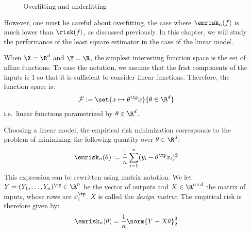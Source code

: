 \documentclass{../cs-classes/cs-classes}
\begin{document}
\begin{figure}
    \centering
    \captionsetup{justification=centering}
    \caption{Overfitting and underfitting}
\end{figure}
However, one must be careful about overfitting, the case where $\emrisk_n(f)$ is much lower than $\risk(f)$, as discussed previously. In this chapter, we will study the performance of the least square estimator in the case of the linear model.

\begin{definition}
    When $\X=\R^d$ and $\Y=\R$, the simplest interesting function space is the set of affine functions. To ease the notation, we assume that the frist components of the inputs is 1 so that it is sufficient to consider linear functions. Therefore, the function space is:
    \begin{equation}
        \mathcal{F}:=\set{x\mapsto \theta^\tp x}{\theta\in\R^d}
    \end{equation}
    i.e.~linear functions parametrized by $\theta\in\R^d$.
\end{definition}

\begin{remark}
    Choosing a linear model, the empirical risk minimization corresponds to the problem of minimizing the following quantity over $\theta\in\R^d$:
    \begin{equation*}
        \emrisk_n(\theta):=\frac{1}{n}\sum_{i=1}^n(y_i-\theta^\tp x_i)^2
    \end{equation*}
    This expression can be rewritten using matrix notation. We let $Y=(Y_1, \dots, Y_n)^\tp\in\R^n$ be the vector of outputs and $X\in\R^{n\times d}$ the matrix of inputs, whose rows are $x_i^\tp$. $X$ is called the \emph{design matrix}. The empirical risk is therefore given by:
    \begin{equation*}
        \emrisk_n(\theta)=\frac{1}{n}\norm{Y-X\theta}^2_2
    \end{equation*}
\end{remark}
\end{document}
